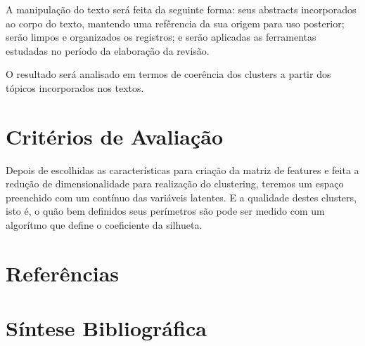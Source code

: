 \documentclass[
	12pt,				%
	a4paper,			%
	english,			%
	brazil,				%
	]{article}
\begin{document}
    A manipula\c c\~ ao do texto ser\' a feita da seguinte forma: seus abstracts incorporados ao corpo do texto, mantendo uma refêrencia da sua origem para uso posterior; ser\~ ao limpos e organizados os registros; e ser\~ ao aplicadas as ferramentas estudadas no período da elabora\c c\~ ao da revis\~ ao.

    O resultado ser\' a analisado em termos de coerência dos clusters a partir dos tópicos incorporados nos textos.

\section{Crit\' erios de Avalia\c c\~ ao} 


Depois de escolhidas as caracter\' isticas para cria{\c c}\~ ao da matriz de features
e feita a redu{\c c}\~ ao de dimensionalidade para realiza{\c c}\~ ao do clustering,
teremos um espa{\c c}o preenchido com um cont\' inuo das vari\' aveis latentes.
E a qualidade destes clusters, isto é,
o qu\~ ao bem definidos seus per\' imetros s\~ ao pode ser medido com um algor\' itmo
que define o coeficiente da silhueta.

    
    



\renewcommand\refname{}
\section{Refer\^ encias}

    \vspace{-4.3em}
    
    
\section{S\' intese Bibliogr\' afica}

    \vspace{-3.5em}
    
 
\end{document}

